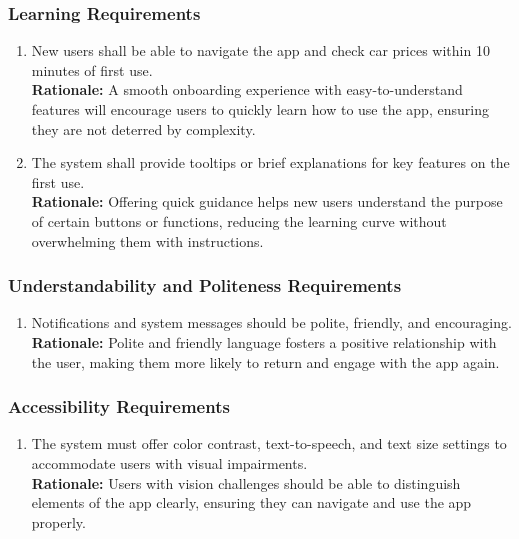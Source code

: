 \documentclass[]{article}
\begin{document}
\subsubsection{Learning Requirements}
\label{ssub:learning_requirements}
\begin{enumerate}[{UH-L}1. ]
    \item New users shall be able to navigate the app and check car prices within 10 minutes of first use.\\
    \textbf{Rationale:} A smooth onboarding experience with easy-to-understand features will encourage users to quickly learn how to use the app, ensuring they are not deterred by complexity.
    \item The system shall provide tooltips or brief explanations for key features on the first use.\\
    \textbf{Rationale:} Offering quick guidance helps new users understand the purpose of certain buttons or functions, reducing the learning curve without overwhelming them with instructions.
\end{enumerate}

\subsubsection{Understandability and Politeness Requirements}
\label{ssub:understandability_and_politeness_requirements}
\begin{enumerate}[{UH-UP}1. ]
    \item Notifications and system messages should be polite, friendly, and encouraging.\\
    \textbf{Rationale:} Polite and friendly language fosters a positive relationship with the user, making them more likely to return and engage with the app again.

\end{enumerate}

\subsubsection{Accessibility Requirements}
\label{ssub:accessibility_requirements}
\begin{enumerate}[{UH-A}1. ]
    \item The system must offer color contrast, text-to-speech, and text size settings to accommodate users with visual impairments.\\
    \textbf{Rationale:} Users with vision challenges should be able to distinguish elements of the app clearly, ensuring they can navigate and use the app properly.

\end{enumerate}
\end{document}
